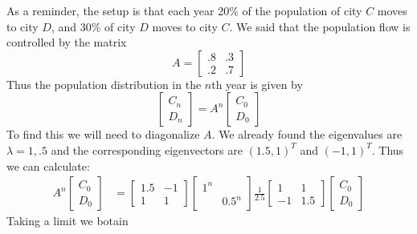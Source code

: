 \documentclass[11pt,oneside]{amsbook}
\theoremstyle{definition}
\theoremstyle{plain}
\theoremstyle{definition}
\theoremstyle{remark}
\numberwithin{equation}{section}
\numberwithin{figure}{section}
\begin{document}
As a reminder, the setup is that each year 20\% of the population of city $C$ moves to city $D$, and 30\% of city $D$ moves to city $C$. We said that the population flow is controlled by the matrix
\[A=\begin{bmatrix}.8&.3\\.2&.7\end{bmatrix}
\]
Thus the population distribution in the $n$th year is given by
\[\begin{bmatrix}C_n\\D_n\end{bmatrix}
  =A^n\begin{bmatrix}C_0\\D_0\end{bmatrix}
\]
To find this we will need to diagonalize $A$. We already found the eigenvalues are $\lambda=1,.5$ and the corresponding eigenvectors are $(1.5,1)^T$ and $(-1,1)^T$. Thus we can calculate:
\begin{align*}
  A^n\begin{bmatrix}C_0\\D_0\end{bmatrix}
  &=\begin{bmatrix}1.5&-1\\1&1\end{bmatrix}
    \begin{bmatrix}1^n\\&0.5^n\end{bmatrix}
    \frac{1}{2.5}
    \begin{bmatrix}1&1\\-1&1.5\end{bmatrix}
    \begin{bmatrix}C_0\\D_0\end{bmatrix}
\end{align*}
Taking a limit we botain
\end{document}
